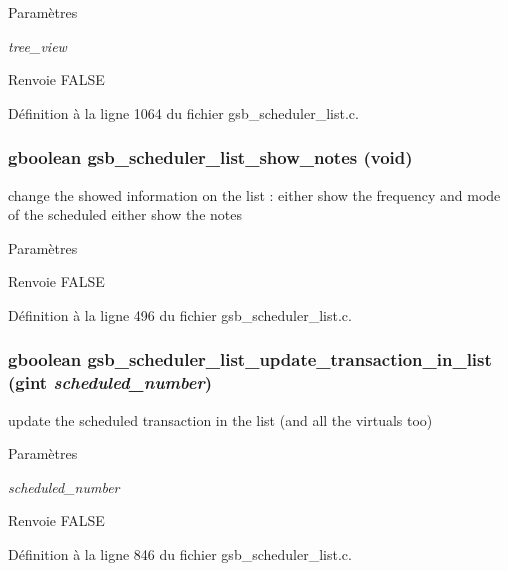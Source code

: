 \begin{DoxyParams}{Paramètres}
\item[{\em tree\_\-view}]\end{DoxyParams}
\begin{DoxyReturn}{Renvoie}
FALSE 
\end{DoxyReturn}


Définition à la ligne 1064 du fichier gsb\_\-scheduler\_\-list.c.

\subsubsection[{gsb\_\-scheduler\_\-list\_\-show\_\-notes}]{\setlength{\rightskip}{0pt plus 5cm}gboolean gsb\_\-scheduler\_\-list\_\-show\_\-notes (void)}\label{gsb__scheduler__list_8h_a9eaf111074be94831038960ae9e56732}
change the showed information on the list : either show the frequency and mode of the scheduled either show the notes


\begin{DoxyParams}{Paramètres}
\item[{\em }]\end{DoxyParams}
\begin{DoxyReturn}{Renvoie}
FALSE 
\end{DoxyReturn}


Définition à la ligne 496 du fichier gsb\_\-scheduler\_\-list.c.

\subsubsection[{gsb\_\-scheduler\_\-list\_\-update\_\-transaction\_\-in\_\-list}]{\setlength{\rightskip}{0pt plus 5cm}gboolean gsb\_\-scheduler\_\-list\_\-update\_\-transaction\_\-in\_\-list (gint {\em scheduled\_\-number})}\label{gsb__scheduler__list_8h_a7b1d97387d5d2e281f3ead3e6ab0311b}
update the scheduled transaction in the list (and all the virtuals too)


\begin{DoxyParams}{Paramètres}
\item[{\em scheduled\_\-number}]\end{DoxyParams}
\begin{DoxyReturn}{Renvoie}
FALSE 
\end{DoxyReturn}


Définition à la ligne 846 du fichier gsb\_\-scheduler\_\-list.c.

